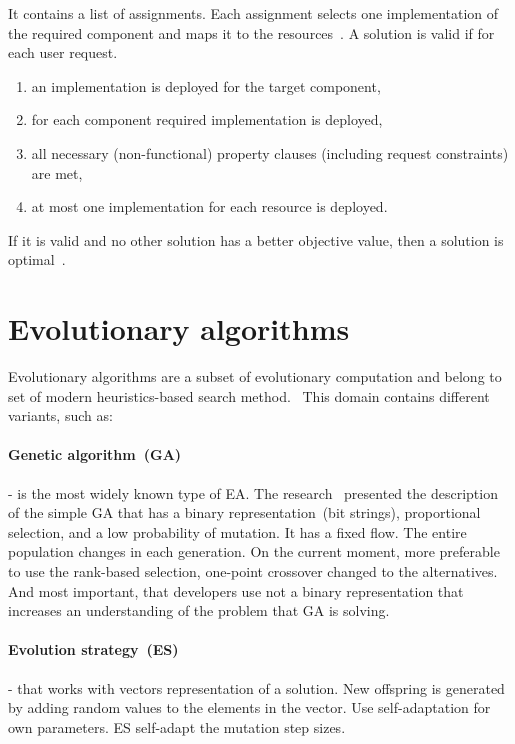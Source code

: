 It contains a list of assignments. Each assignment selects one implementation of the required component and maps it to the resources~\cite{gotz18}.
A solution is valid if for each user request.

\begin{enumerate}
	\item an implementation is deployed for the target component,
	\item for each component required implementation is deployed,
	\item all necessary (non-functional) property clauses (including request constraints) are met,
	\item at most one implementation for each resource is deployed.
\end{enumerate}

If it is valid and no other solution has a better objective value, then a solution is optimal~\cite{gotz18}.

\section{Evolutionary algorithms}
\label{sec:GeneticAlgorithm}

Evolutionary algorithms are a subset of evolutionary computation and belong to set of modern heuristics-based search method.~\cite{vikhar16}
This domain contains different variants, such as:
\paragraph{Genetic algorithm~(GA)} - is the most widely known type of EA\cite{eiben03}. The research~\cite{deJong75} presented the description of the simple GA that has a binary representation~(bit strings), proportional selection, and a low probability of mutation. It has a fixed flow. The entire population changes in each generation. On the current moment, more preferable to use the rank-based selection, one-point crossover changed to the alternatives. And most important, that developers use not a binary representation that increases an understanding of the problem that GA is solving.
\paragraph{Evolution strategy~(ES)} - that works with vectors representation of a solution. New offspring is generated by adding random values to the elements in the vector. Use self-adaptation for own parameters. ES self-adapt the mutation step sizes.
